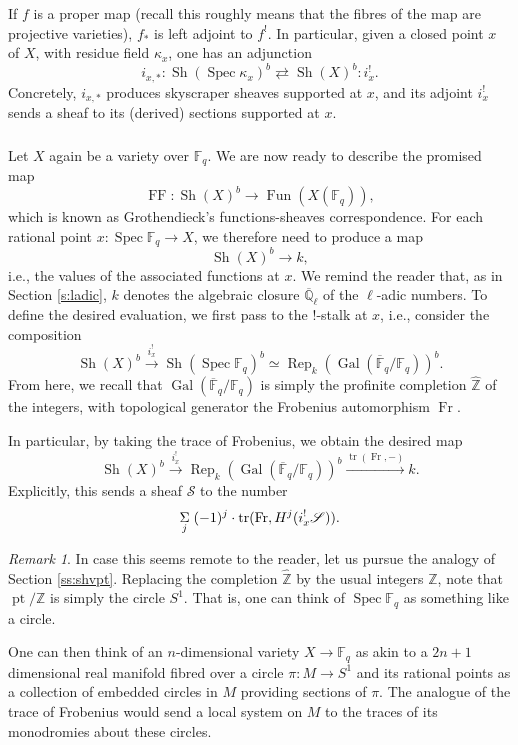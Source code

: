 \documentclass[10pt]{amsart}
\newcommand{\on}{\operatorname}
\newcommand{\Fq}{\mathbb{F}_q}
\newcommand{\Fun}{\on{Fun}}
\theoremstyle{remark}
\newtheorem{re}[subsubsection]{Remark}
\newcommand{\sS}{\mathscr{S}}
\newcommand{\Sp}{\on{Spec }}
\newcommand{\tr}{\operatorname{tr}}
\numberwithin{equation}{section}
\begin{document}
	If $f$ is a proper map (recall this roughly means that the fibres of the map are 
	projective varieties), $f_*$ is left adjoint to $f^!$. In particular, given 
	a closed point $x$ of $X$, with residue field $\kappa_x$, one has an 
	adjunction
	\[
	i_{x, *}: \on{Sh}(\on{Spec }\kappa_x)^b \rightleftarrows \on{Sh}(X)^b: 
	i_x^!.  
	\]
	Concretely, $i_{x, *}$ produces skyscraper sheaves supported at $x$, and 
	its adjoint $i_{x}^!$ sends a sheaf to its (derived) sections supported at 
	$x$. 
	
	\subsubsection{} Let $X$ again be a variety over $\Fq$. We are now 
	ready to describe the promised map
	\[
	\on{FF}: \on{Sh}(X)^b \rightarrow \Fun(X(\Fq)), 
	\]
	which is known as Grothendieck's functions-sheaves correspondence. 
	For each rational point $x: \Sp \Fq \rightarrow X$, we therefore need 
	to produce a map 
	\[
	\on{Sh}(X)^b \rightarrow k,
	\]
	i.e., the values of the associated functions at $x$. We remind the reader that,  as in Section \ref{s:ladic},  $k$ denotes the algebraic closure $\overline{\mathbb{Q}}_\ell$ of the $\ell$-adic numbers. To define the desired evaluation, we first pass 
	to the $!$-stalk at $x$, i.e., consider the composition 
	\[
	\on{Sh}(X)^b \xrightarrow{i_x^!} \on{Sh}(\Sp \Fq)^b \simeq 
	\on{Rep}_k(\on{Gal}(\overline{\mathbb{F}}_q / \Fq))^b. 
	\]
	From here, we recall that $\on{Gal}(\overline{\mathbb{F}}_q / \Fq)$ is 
	simply the profinite completion $\widehat{\mathbb{Z}}$ of the integers, 
	with topological generator the Frobenius automorphism $\on{Fr}$. 
	
	In particular, by taking the trace of Frobenius, we obtain the desired map 
	\[
	\on{Sh}(X)^b \xrightarrow{i^!_x} 
	\on{Rep}_k(\on{Gal}(\overline{\mathbb{F}}_q/\Fq))^b 
	\xrightarrow{\on{tr}(\on{Fr}, -)} k. 
	\]
	Explicitly, this sends a sheaf $\sS$ to the number 
	\[
	\underset{j}{\Sigma} \hspace{1mm} (-1)^j \cdot \tr(\on{Fr}, H^j( i^!_x 
	\sS)). 
	\]
	
	
	\begin{re} In case this seems remote to the reader, let us pursue the analogy 
	of Section \ref{ss:shvpt}. Replacing the completion $\widehat{\mathbb{Z}}$ 
	by the usual integers $\mathbb{Z}$, note that $\on{pt} / \mathbb{Z}$ is 
	simply the circle $S^1$. That is, one can think of $\Sp \Fq$ as something 
	like a circle.  
		
		One can then think of an $n$-dimensional variety $X \rightarrow \Fq$ as 
		akin to a $2n+1$ dimensional real manifold fibred over a circle $\pi: M 
		\rightarrow S^1$ and its rational points as a collection of embedded 
		circles in $M$ providing sections of $\pi$. The analogue of the trace of Frobenius would send a 
		local system on $M$ to the traces of its monodromies about these 
		circles. \end{re}
	
\end{document}
